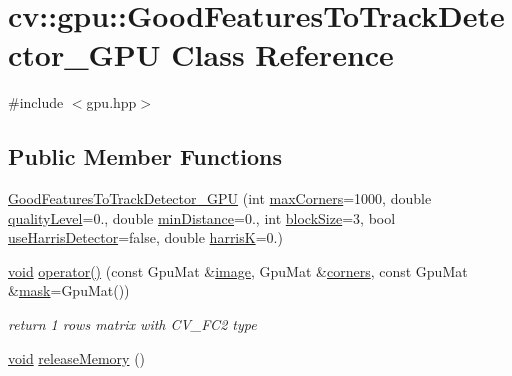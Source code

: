 \hypertarget{classcv_1_1gpu_1_1GoodFeaturesToTrackDetector__GPU}{\section{cv\-:\-:gpu\-:\-:Good\-Features\-To\-Track\-Detector\-\_\-\-G\-P\-U Class Reference}
\label{classcv_1_1gpu_1_1GoodFeaturesToTrackDetector__GPU}
}


{\ttfamily \#include $<$gpu.\-hpp$>$}

\subsection*{Public Member Functions}
\begin{DoxyCompactItemize}
\item 
\hyperlink{classcv_1_1gpu_1_1GoodFeaturesToTrackDetector__GPU_a592765f1969b419cbd15e7c6f852dad6}{Good\-Features\-To\-Track\-Detector\-\_\-\-G\-P\-U} (int \hyperlink{classcv_1_1gpu_1_1GoodFeaturesToTrackDetector__GPU_ac1e628216d9e0cef86e53f3804660ea3}{max\-Corners}=1000, double \hyperlink{classcv_1_1gpu_1_1GoodFeaturesToTrackDetector__GPU_a9f5f8a99c745336967c83605ab01adf4}{quality\-Level}=0., double \hyperlink{classcv_1_1gpu_1_1GoodFeaturesToTrackDetector__GPU_af0ea46c4aec5a06aece948dba21b17c3}{min\-Distance}=0., int \hyperlink{classcv_1_1gpu_1_1GoodFeaturesToTrackDetector__GPU_a06b3fe45e1f30303c8f50fd9d9d0fe04}{block\-Size}=3, bool \hyperlink{classcv_1_1gpu_1_1GoodFeaturesToTrackDetector__GPU_a5ae93a396eeb8eb0978026d57b14acea}{use\-Harris\-Detector}=false, double \hyperlink{classcv_1_1gpu_1_1GoodFeaturesToTrackDetector__GPU_a17f5ed8317c8f07eac81568971b07bc9}{harris\-K}=0.)
\item 
\hyperlink{legacy_8hpp_a8bb47f092d473522721002c86c13b94e}{void} \hyperlink{classcv_1_1gpu_1_1GoodFeaturesToTrackDetector__GPU_a7c670c51a9f29009aadf1538e133f52d}{operator()} (const Gpu\-Mat \&\hyperlink{legacy_8hpp_ad62b16ab219ae2483e8a3d921c44cc97}{image}, Gpu\-Mat \&\hyperlink{imgproc__c_8h_a223e965e192c7025d6c6be77305f515b}{corners}, const Gpu\-Mat \&\hyperlink{tracking_8hpp_a6b13ecd2fd6ec7ad422f1d7863c3ad19}{mask}=Gpu\-Mat())
\begin{DoxyCompactList}\small\item\em return 1 rows matrix with C\-V\-\_\-F\-C2 type \end{DoxyCompactList}\item 
\hyperlink{legacy_8hpp_a8bb47f092d473522721002c86c13b94e}{void} \hyperlink{classcv_1_1gpu_1_1GoodFeaturesToTrackDetector__GPU_a202411eb7d3aad5b9233321921b0aada}{release\-Memory} ()
\end{DoxyCompactItemize}
